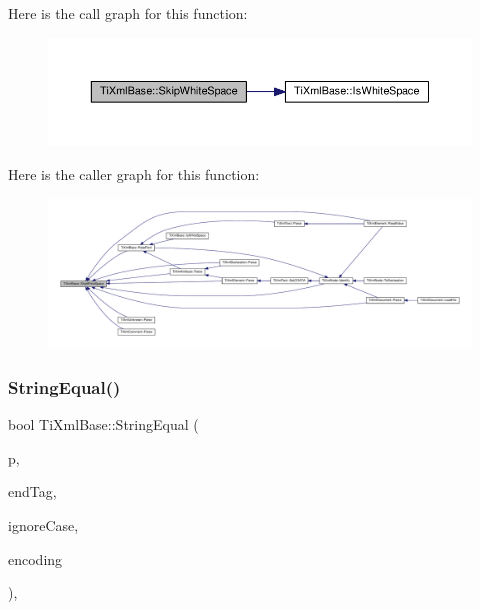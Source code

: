 Here is the call graph for this function\+:
\nopagebreak
\begin{figure}[H]
\begin{center}
\leavevmode
\includegraphics[width=350pt]{class_ti_xml_base_ac0c3d66d8a9e6996a1fa016275e16875_cgraph}
\end{center}
\end{figure}
Here is the caller graph for this function\+:
\nopagebreak
\begin{figure}[H]
\begin{center}
\leavevmode
\includegraphics[width=350pt]{class_ti_xml_base_ac0c3d66d8a9e6996a1fa016275e16875_icgraph}
\end{center}
\end{figure}
\mbox{\label{class_ti_xml_base_a51631e6986179558b9e5850723ed165a}} 
\subsubsection{\texorpdfstring{String\+Equal()}{StringEqual()}}
{\footnotesize\ttfamily bool Ti\+Xml\+Base\+::\+String\+Equal (\begin{DoxyParamCaption}\item[{const char $\ast$}]{p,  }\item[{const char $\ast$}]{end\+Tag,  }\item[{bool}]{ignore\+Case,  }\item[{\hyperlink{tinyxml_8h_a88d51847a13ee0f4b4d320d03d2c4d96}{Ti\+Xml\+Encoding}}]{encoding }\end{DoxyParamCaption})\hspace{0.3cm}{\ttfamily [static]}, {\ttfamily [protected]}}

